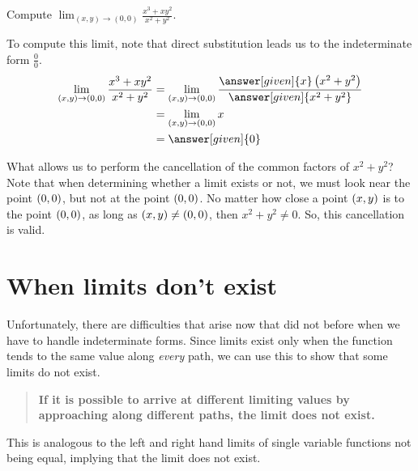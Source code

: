 \documentclass{ximera}
\begin{document}
\begin{example}
  Compute $\lim_{(x,y)\to(0,0) }\frac{x^3+xy^2}{x^2+y^2}$.
  \begin{explanation}
   To compute this limit, note that direct substitution leads us to the indeterminate form $\frac{0}{0}$.
    \begin{align*}
      \lim_{\point{x,y}\to\point{0,0}}\frac{x^3+xy^2}{x^2+y^2}
      &=\lim_{\point{x,y}\to\point{0,0}} \frac{\answer[given]{x}\left(x^2+y^2\right)}{\answer[given]{x^2+y^2}}\\
      &=\lim_{\point{x,y}\to\point{0,0}} x\\
      &=\answer[given]{0}
    \end{align*}

    What allows us to perform the cancellation of the common factors of $x^2+y^2$?  Note that when determining whether a limit exists or not, we must look near the point $\left(0,0\right)$, but not at the point $\left(0,0\right)$.  No matter how close a point  $\left(x,y\right)$ is to the point $\left(0,0\right)$, as long as  $\left(x,y\right) \neq \left(0,0\right)$, then $x^2+y^2 \neq 0$. So, this cancellation is valid.
  \end{explanation}
\end{example}

\section{When limits don't exist}
Unfortunately, there are difficulties that arise now that did not before when we have to handle indeterminate forms.  Since limits exist only when the function tends to the same value along \emph{every} path, we can use this to show that some limits do not exist.

\begin{quote}
  \textbf{If it is possible to arrive at different limiting values by
    approaching along different paths, the limit does not exist.}
\end{quote}

This is analogous to the left and right hand limits of single variable
functions not being equal, implying that the limit does not exist.
\end{document}
